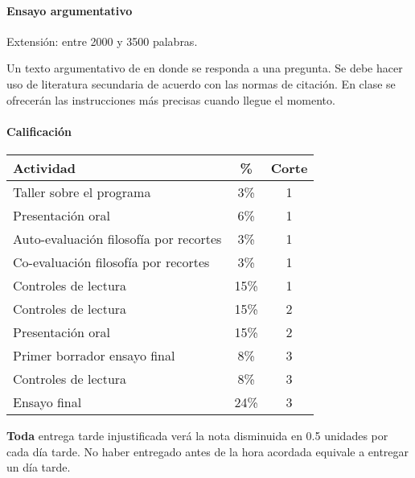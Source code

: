 \documentclass[spanish,]{article}
\let\oldparagraph\paragraph
\renewcommand{\paragraph}[1]{\oldparagraph{#1}\mbox{}}
\begin{document}
\paragraph{\texorpdfstring{\textbf{Ensayo
argumentativo}}{Ensayo argumentativo}}\label{ensayo-argumentativo}

Extensión: entre 2000 y 3500 palabras.

Un texto argumentativo de en donde se responda a una pregunta. Se debe
hacer uso de literatura secundaria de acuerdo con las normas de
citación. En clase se ofrecerán las instrucciones más precisas cuando
llegue el momento.

\paragraph{\texorpdfstring{\textbf{Calificación}}{Calificación}}\label{calificacion}

\begin{tabular}{|l|c|c|}
\hline
\textbf{Actividad} & \textbf{\%} & \textbf{Corte}\\
\hline
Taller sobre el programa & 3\% & 1\\
\hline
Presentación oral & 6\% & 1\\
\hline
Auto-evaluación filosofía por recortes & 3\% & 1\\
\hline
Co-evaluación filosofía por recortes & 3\% & 1\\
\hline
Controles de lectura & 15\% & 1\\
\hline
Controles de lectura & 15\% & 2\\
\hline
Presentación oral & 15\% & 2\\
\hline
Primer borrador ensayo final & 8\% & 3\\
\hline
Controles de lectura & 8\% & 3\\
\hline
Ensayo final & 24\% & 3\\
\hline
\end{tabular}

\textbf{Toda} entrega tarde injustificada verá la nota disminuida en 0.5
unidades por cada día tarde. No haber entregado antes de la hora
acordada equivale a entregar un día tarde.
\end{document}
